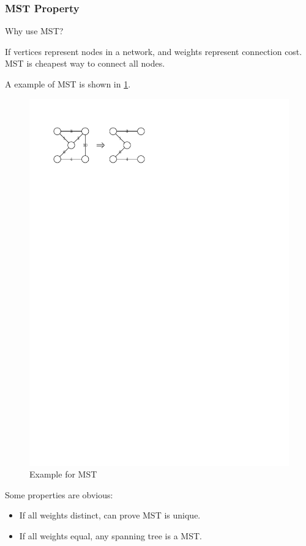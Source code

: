 \subsubsection{MST Property}
Why use MST?

If vertices represent nodes in a network,
and weights represent connection cost.
MST is cheapest way to connect all nodes.

A example of MST is shown in \cref{fig:MSTexample}.
\begin{figure}[ht]
    \caption{Example for MST}\label{fig:MSTexample}
    \centering
    \includegraphics[scale=1.2]{fig/MSTexample}
\end{figure}

\observation

Some properties are obvious:
\begin{itemize}
    \item If all weights distinct, can prove MST is unique.
    \item If all weights equal, any spanning tree is a MST.
\end{itemize}

